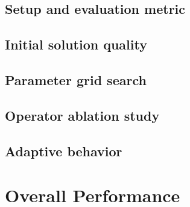 \documentclass[10pt, a4paper]{article}
\begin{document}
\subsection{Setup and evaluation metric}
\subsection{Initial solution quality}
\subsection{Parameter grid search}
\subsection{Operator ablation study}
\subsection{Adaptive behavior}

\section{Overall Performance}
\end{document}
